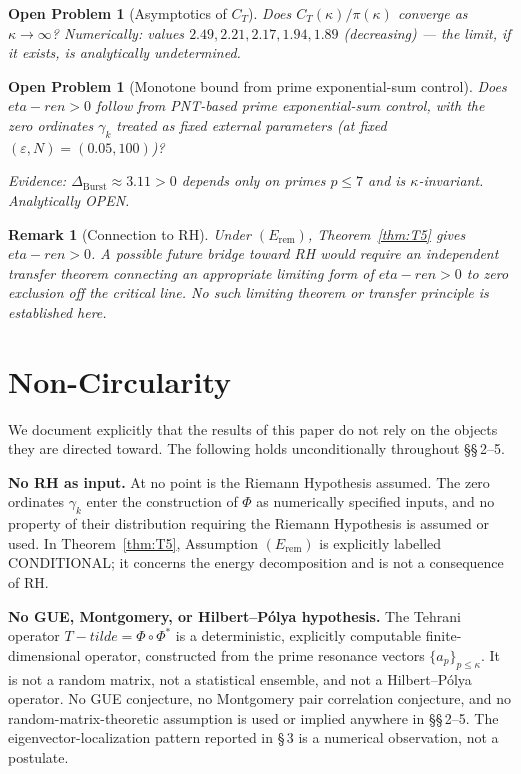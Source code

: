 \documentclass[11pt]{article}
\def\Tt{T-tilde}%
\def\etaren{eta-ren}%
\newtheorem*{remark}{Remark}
\newtheorem{openproblem}[theorem]{Open Problem}
\newcommand{\etaren}{\eta_{\mathrm{ren}}}
\newcommand{\Tt}{\widetilde{T}}
\newcommand{\CT}{C_{T}}
\newcommand{\Dburstvar}{\Delta_{\mathrm{Burst}}}
\begin{document}
\begin{openproblem}[Asymptotics of $\CT$]\label{op:ct}
Does $\CT(\kappa)/\pi(\kappa)$ converge as $\kappa\to\infty$?
Numerically: values $2.49, 2.21, 2.17, 1.94, 1.89$ (decreasing) ---
the limit, if it exists, is analytically undetermined.
\end{openproblem}

\begin{openproblem}[Monotone bound from prime exponential-sum control]\label{op:mono}
Does $\etaren > 0$ follow from PNT-based prime exponential-sum
control, with the zero ordinates $\gamma_k$ treated as fixed
external parameters (at fixed $(\varepsilon,N)=(0.05,100)$)?

Evidence: $\Dburstvar\approx 3.11 > 0$ depends only on primes
$p\leq 7$ and is $\kappa$-invariant.
Analytically OPEN.
\end{openproblem}

\begin{remark}[Connection to RH]
Under $(E_{\mathrm{rem}})$, Theorem~\ref{thm:T5} gives $\etaren > 0$.
A possible future bridge toward RH would require an independent
transfer theorem connecting an appropriate limiting form of
$\etaren>0$ to zero exclusion off the critical line.
No such limiting theorem or transfer principle is established here.
\end{remark}

\section*{Non-Circularity}
\label{sec:nocirc}

We document explicitly that the results of this paper do not rely on
the objects they are directed toward. The following holds unconditionally
throughout \S\S\,2--5.

\textbf{No RH as input.}
At no point is the Riemann Hypothesis assumed. The zero ordinates
$\gamma_k$ enter the construction of $\Phi$ as numerically specified
inputs, and no property of their distribution requiring the Riemann
Hypothesis is assumed or used. In Theorem~\ref{thm:T5}, Assumption $(E_{\mathrm{rem}})$ is
explicitly labelled CONDITIONAL; it concerns the energy decomposition
and is not a consequence of RH.

\textbf{No GUE, Montgomery, or Hilbert--P\'olya hypothesis.}
The Tehrani operator $\Tt = \Phi\circ\Phi^*$ is a deterministic,
explicitly computable finite-dimensional operator, constructed from
the prime resonance vectors $\{a_p\}_{p\le\kappa}$. It is not a random
matrix, not a statistical ensemble, and not a Hilbert--P\'olya
operator. No GUE conjecture, no Montgomery pair correlation conjecture,
and no random-matrix-theoretic assumption is used or implied anywhere
in \S\S\,2--5. The eigenvector-localization pattern reported in
\S\,3 is a numerical observation, not a postulate.
\end{document}

